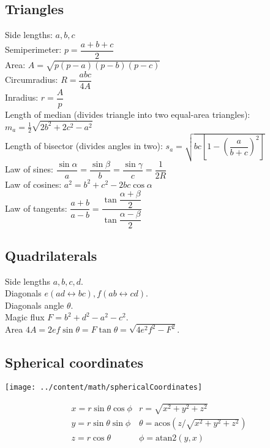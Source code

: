 \subsection{Triangles}
Side lengths: $a,b,c$\\
Semiperimeter: $p=\dfrac{a+b+c}{2}$\\
Area: $A=\sqrt{p(p-a)(p-b)(p-c)}$\\
Circumradius: $R=\dfrac{abc}{4A}$\\
Inradius: $r=\dfrac{A}{p}$\\
Length of median (divides triangle into two equal-area triangles): $m_a=\tfrac{1}{2}\sqrt{2b^2+2c^2-a^2}$\\
Length of bisector (divides angles in two): $s_a=\sqrt{bc\left[1-\left(\dfrac{a}{b+c}\right)^2\right]}$\\
Law of sines: $\dfrac{\sin\alpha}{a}=\dfrac{\sin\beta}{b}=\dfrac{\sin\gamma}{c}=\dfrac{1}{2R}$\\
Law of cosines: $a^2=b^2+c^2-2bc\cos\alpha$\\
Law of tangents: $\dfrac{a+b}{a-b}=\dfrac{\tan\dfrac{\alpha+\beta}{2}}{\tan\dfrac{\alpha-\beta}{2}}$\\

\subsection{Quadrilaterals}
Side lengths $a,b,c,d$.\\
Diagonals $e(ad\leftrightarrow bc), f(ab\leftrightarrow cd)$.\\
Diagonals angle $\theta$.\\
Magic flux $F=b^2+d^2-a^2-c^2$.\\
Area $4A=2ef\sin\theta=F\tan\theta=\sqrt{4e^2f^2-F^2}$.\\

\subsection{Spherical coordinates}
\centerline{\texttt{[image: ../content/math/sphericalCoordinates]}}
\[\begin{array}{cc}
x = r\sin\theta\cos\phi & r = \sqrt{x^2+y^2+z^2}\\
y = r\sin\theta\sin\phi & \theta = \textrm{acos}(z/\sqrt{x^2+y^2+z^2})\\
z = r\cos\theta & \phi = \textrm{atan2}(y,x)
\end{array}\]

